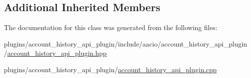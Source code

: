 \subsection*{Additional Inherited Members}


The documentation for this class was generated from the following files\+:\begin{DoxyCompactItemize}
\item 
plugins/account\+\_\+history\+\_\+api\+\_\+plugin/include/aacio/account\+\_\+history\+\_\+api\+\_\+plugin/\mbox{\hyperlink{account__history__api__plugin_8hpp}{account\+\_\+history\+\_\+api\+\_\+plugin.\+hpp}}\item 
plugins/account\+\_\+history\+\_\+api\+\_\+plugin/\mbox{\hyperlink{account__history__api__plugin_8cpp}{account\+\_\+history\+\_\+api\+\_\+plugin.\+cpp}}\end{DoxyCompactItemize}
